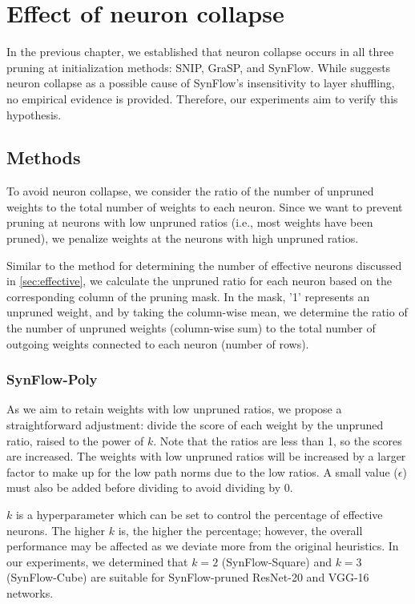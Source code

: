 
\chapter{Effect of neuron collapse}
\label{ch:effect}
\vspace{1em}

In the previous chapter, we established that neuron collapse occurs in all three pruning at initialization methods: SNIP, GraSP, and SynFlow. While \textcite{frankle21} suggests neuron collapse as a possible cause of SynFlow's insensitivity to layer shuffling, no empirical evidence is provided. Therefore, our experiments aim to verify this hypothesis.

\section{Methods}
To avoid neuron collapse, we consider the ratio of the number of unpruned weights to the total number of weights to each neuron. Since we want to prevent pruning at neurons with low unpruned ratios (i.e., most weights have been pruned), we penalize weights at the neurons with high unpruned ratios.

Similar to the method for determining the number of effective neurons discussed in \autoref{sec:effective}, we calculate the unpruned ratio for each neuron based on the corresponding column of the pruning mask. In the mask, '1' represents an unpruned weight, and by taking the column-wise mean, we determine the ratio of the number of unpruned weights (column-wise sum) to the total number of outgoing weights connected to each neuron (number of rows).

\subsection{SynFlow-Poly}
As we aim to retain weights with low unpruned ratios, we propose a straightforward adjustment: divide the score of each weight by the unpruned ratio, raised to the power of $k$. Note that the ratios are less than 1, so the scores are increased. The weights with low unpruned ratios will be increased by a larger factor to make up for the low path norms due to the low ratios. A small value ($\epsilon$) must also be added before dividing to avoid dividing by 0.

$k$ is a hyperparameter which can be set to control the percentage of effective neurons. The higher $k$ is, the higher the percentage; however, the overall performance may be affected as we deviate more from the original heuristics. In our experiments, we determined that $k=2$ (SynFlow-Square) and $k=3$ (SynFlow-Cube) are suitable for SynFlow-pruned ResNet-20 and VGG-16 networks. 

